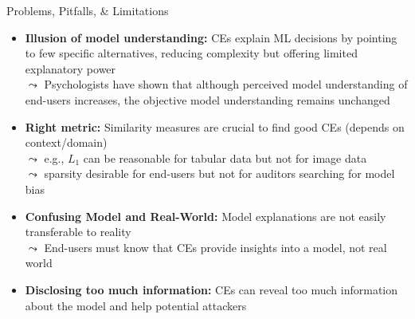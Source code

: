 \documentclass[11pt,compress,t,notes=noshow, aspectratio=169, xcolor=table]{beamer}
\begin{document}
\begin{frame}{Problems, Pitfalls, \& Limitations}
\begin{itemize}[<+->]
    \item \textbf{Illusion of model understanding:} 
    CEs explain ML decisions by pointing to few specific alternatives, reducing complexity but offering limited explanatory power\\
    $\leadsto$ %
    Psychologists have shown that although perceived model understanding of end-users increases, the objective model understanding remains unchanged
    
    \item \textbf{Right metric:} Similarity measures are crucial to find good CEs (depends on context/domain)\\
    $\leadsto$ e.g., $L_1$ can be reasonable for tabular data but not for image data\\
    $\leadsto$ sparsity desirable for end-users but not for auditors searching for model bias

    \item \textbf{Confusing Model and Real-World:} Model explanations are not easily transferable to reality\\
    $\leadsto$ End-users must know that CEs provide insights into a model, not real world %
    \item \textbf{Disclosing too much information:} 
    CEs can reveal too much information about the model and help potential attackers
    \end{itemize}
\end{frame}
\end{document}

